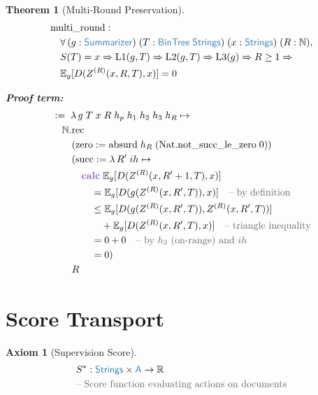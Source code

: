 \documentclass[11pt]{article}
\theoremstyle{definition}
\newtheorem{axiomenv}{Axiom}
\theoremstyle{plain}
\newtheorem{thmenv}{Theorem}
\newcommand{\kw}[1]{\textcolor{keyword}{\textbf{#1}}}
\newcommand{\ty}[1]{\textcolor{type}{\mathsf{#1}}}
\newcommand{\fn}[1]{\mathrm{#1}}
\newcommand{\cmt}[1]{\textcolor{comment}{\text{-- #1}}}
\newcommand{\lam}{\lambda\,}
\newcommand{\all}{\forall\,}
\newcommand{\arr}{\to}
\newcommand{\Arr}{\Rightarrow}
\newcommand{\pf}{:=\;}
\newcommand{\Strings}{\ty{Strings}}
\newcommand{\A}{\ty{A}}
\newcommand{\R}{\mathbb{R}}
\newcommand{\N}{\mathbb{N}}
\newcommand{\Eg}{\mathbb{E}_g}
\newcommand{\ZR}{Z^{(R)}}
\begin{document}
\begin{thmenv}[Multi-Round Preservation]
\label{thm:multiround}
\begin{align*}
&\fn{multi\_round} : \\
&\quad \all (g : \ty{Summarizer})\; (T : \ty{BinTree}\;\Strings)\; (x : \Strings)\; (R : \N), \\
&\quad S(T) = x \Arr \fn{L1}(g, T) \Arr \fn{L2}(g, T) \Arr \fn{L3}(g) \Arr R \geq 1 \Arr \\
&\quad \Eg[D(\ZR(x, R, T), x)] = 0
\end{align*}

\textbf{Proof term:}
\begin{align*}
&\pf \lam g\; T\; x\; R\; h_p\; h_1\; h_2\; h_3\; h_R \mapsto \\
&\quad \N.\fn{rec} \\
&\quad\quad (\fn{zero} := \fn{absurd}\; h_R\; (\fn{Nat.not\_succ\_le\_zero}\; 0)) \\
&\quad\quad (\fn{succ} := \lam R'\; ih \mapsto \\
&\quad\quad\quad \kw{calc}\; \Eg[D(\ZR(x, R'+1, T), x)] \\
&\quad\quad\quad\quad = \Eg[D(g(\ZR(x, R', T)), x)] \quad\cmt{by definition} \\
&\quad\quad\quad\quad \leq \Eg[D(g(\ZR(x, R', T)), \ZR(x, R', T))] \\
&\quad\quad\quad\quad\quad + \Eg[D(\ZR(x, R', T), x)] \quad\cmt{triangle inequality} \\
&\quad\quad\quad\quad = 0 + 0 \quad\cmt{by $h_3$ (on-range) and $ih$} \\
&\quad\quad\quad\quad = 0) \\
&\quad\quad R
\end{align*}
\end{thmenv}

\section{Score Transport}
\label{sec:transport}

\begin{axiomenv}[Supervision Score]
\label{ax:supervision}
\begin{align*}
&S^* : \Strings \times \A \arr \R \\
&\cmt{Score function evaluating actions on documents}
\end{align*}
\end{axiomenv}
\end{document}
